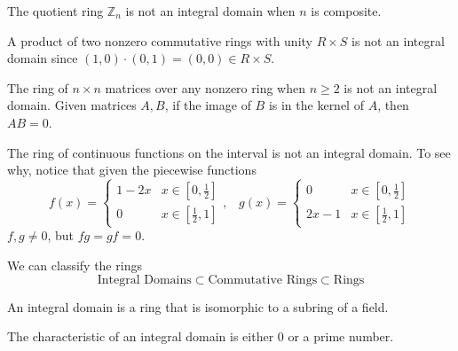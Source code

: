 \documentclass{article}
\begin{document}
      \begin{example}
        The quotient ring $\mathbb{Z}_n$ is not an integral domain when $n$ is composite. 
      \end{example}

      \begin{example}
        A product of two nonzero commutative rings with unity $R \times S$ is not an integral domain since $(1,0) \cdot (0, 1) = (0, 0) \in R \times S$. 
      \end{example}

      \begin{example}
        The ring of $n \times n$ matrices over any nonzero ring when $ n \geq 2$ is not an integral domain. Given matrices $A, B$, if the image of $B$ is in the kernel of $A$, then $A B = 0$.
      \end{example}

      \begin{example}
        The ring of continuous functions on the interval is not an integral domain. To see why, notice that given the piecewise functions 
        \begin{equation}
          f (x) = \begin{cases}
          1 - 2x & x \in [0, \frac{1}{2}] \\
          0 & x \in [\frac{1}{2}, 1] 
          \end{cases}, \; \;\;g (x) = \begin{cases}
          0 & x \in [0, \frac{1}{2}] \\
          2x - 1 & x \in [\frac{1}{2}, 1] 
          \end{cases}
        \end{equation}
        $f, g \neq 0$, but $f g = g f = 0$. 
      \end{example}

      We can classify the rings
      \begin{equation}
        \text{Integral Domains} \subset \text{Commutative Rings} \subset \text{Rings}
      \end{equation}

      \begin{proposition}
        An integral domain is a ring that is isomorphic to a subring of a field. 
      \end{proposition}

      \begin{proposition}
        The characteristic of an integral domain is either $0$ or a prime number. 
      \end{proposition}
\end{document}
